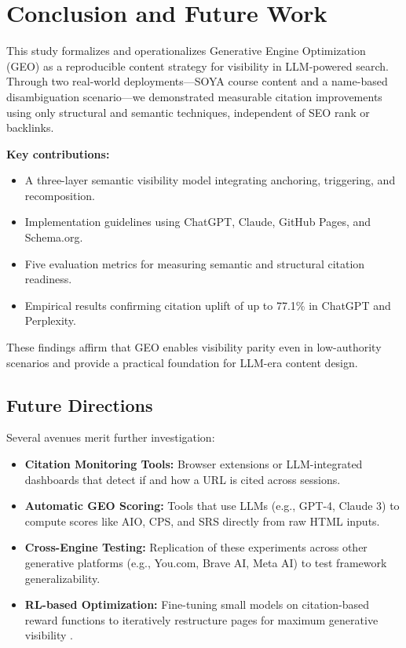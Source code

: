 \section{Conclusion and Future Work}

This study formalizes and operationalizes Generative Engine Optimization (GEO) as a reproducible content strategy for visibility in LLM-powered search. Through two real-world deployments---SOYA course content and a name-based disambiguation scenario---we demonstrated measurable citation improvements using only structural and semantic techniques, independent of SEO rank or backlinks.

\textbf{Key contributions:}
\begin{itemize}
  \item A three-layer semantic visibility model integrating anchoring, triggering, and recomposition.
  \item Implementation guidelines using ChatGPT, Claude, GitHub Pages, and Schema.org.
  \item Five evaluation metrics for measuring semantic and structural citation readiness.
  \item Empirical results confirming citation uplift of up to 77.1\% in ChatGPT and Perplexity.
\end{itemize}

These findings affirm that GEO enables visibility parity even in low-authority scenarios and provide a practical foundation for LLM-era content design.

\subsection{Future Directions}

Several avenues merit further investigation:

\begin{itemize}
  \item \textbf{Citation Monitoring Tools:} Browser extensions or LLM-integrated dashboards that detect if and how a URL is cited across sessions.
  \item \textbf{Automatic GEO Scoring:} Tools that use LLMs (e.g., GPT-4, Claude 3) to compute scores like AIO, CPS, and SRS directly from raw HTML inputs.
  \item \textbf{Cross-Engine Testing:} Replication of these experiments across other generative platforms (e.g., You.com, Brave AI, Meta AI) to test framework generalizability.
  \item \textbf{RL-based Optimization:} Fine-tuning small models on citation-based reward functions to iteratively restructure pages for maximum generative visibility \cite{luttgenau2025beyondseo}.
\end{itemize}

